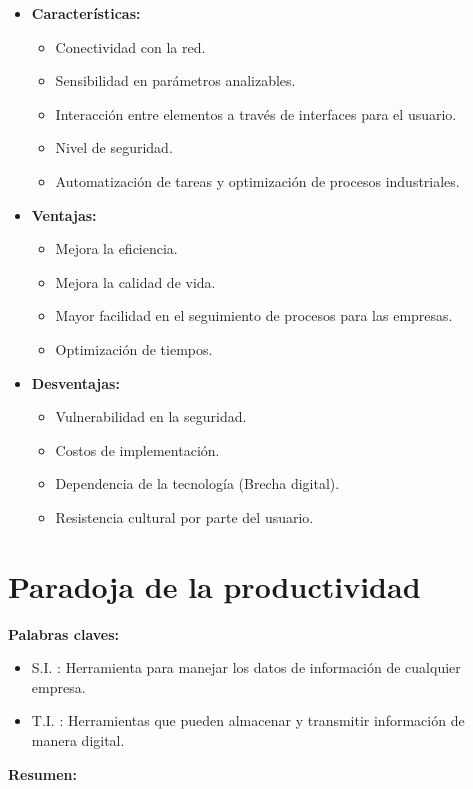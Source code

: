 \documentclass{templateNote}
\begin{document}
\begin{itemize}
    \item \textbf{Características:}
    \begin{itemize}
        \item Conectividad con la red.
        \item Sensibilidad en parámetros analizables.
        \item Interacción entre elementos a través de interfaces para el usuario.
        \item Nivel de seguridad.
        \item Automatización de tareas y optimización de procesos industriales.
    \end{itemize}
    \item \textbf{Ventajas:}
    \begin{itemize}
        \item Mejora la eficiencia.
        \item Mejora la calidad de vida.
        \item Mayor facilidad en el seguimiento de procesos para las empresas.
        \item Optimización de tiempos.
    \end{itemize}
    \item \textbf{Desventajas:}
    \begin{itemize}
        \item Vulnerabilidad en la seguridad.
        \item Costos de implementación.
        \item Dependencia de la tecnología (Brecha digital).
        \item Resistencia cultural por parte del usuario.
    \end{itemize}
\end{itemize}
\newpage
\section{Paradoja de la productividad}
\noindent
\textbf{Palabras claves:}
\begin{itemize}
    \item S.I. : Herramienta para manejar los datos de informaci\'on de cualquier empresa.
    \item T.I. : Herramientas que pueden almacenar y transmitir informaci\'on de manera digital.
\end{itemize}

\noindent
\textbf{Resumen:}
\end{document}
